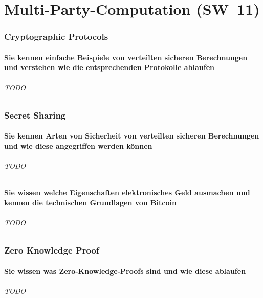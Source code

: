 \documentclass[10pt,a4paper]{article}
\begin{document}
\part{Multi-Party-Computation (SW~11)}
\section{Cryptographic Protocols}
\subsection*{Sie kennen einfache Beispiele von verteilten sicheren Berechnungen und verstehen wie die entsprechenden Protokolle ablaufen}
\paragraph*{TODO}

\section{Secret Sharing}
\subsection*{Sie kennen Arten von Sicherheit von verteilten sicheren Berechnungen und wie diese angegriffen werden können}
\paragraph*{TODO}

\subsection*{Sie wissen welche Eigenschaften elektronisches Geld ausmachen und kennen die technischen Grundlagen von Bitcoin}
\paragraph*{TODO}

\section{Zero Knowledge Proof}
\subsection*{Sie wissen was Zero-Knowledge-Proofs sind und wie diese ablaufen}
\paragraph*{TODO}
\end{document}
